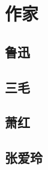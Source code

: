 \documentclass[12pt,utf8]{book}
\begin{document}
% 


\part{作家}



\chapter{鲁迅}























\chapter{三毛}




\clearpage

% 
% 



\clearpage


\chapter{萧红}



% 






\chapter{张爱玲}
\end{document}
